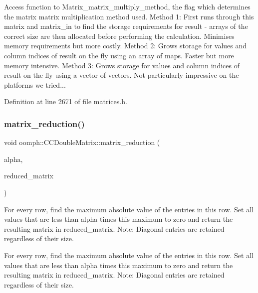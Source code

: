Access function to Matrix\+\_\+matrix\+\_\+multiply\+\_\+method, the flag which determines the matrix matrix multiplication method used. Method 1\+: First runs through this matrix and matrix\+\_\+in to find the storage requirements for result -\/ arrays of the correct size are then allocated before performing the calculation. Minimises memory requirements but more costly. Method 2\+: Grows storage for values and column indices of result \textquotesingle{}on the fly\textquotesingle{} using an array of maps. Faster but more memory intensive. Method 3\+: Grows storage for values and column indices of result \textquotesingle{}on the fly\textquotesingle{} using a vector of vectors. Not particularly impressive on the platforms we tried... 



Definition at line 2671 of file matrices.\+h.

\mbox{\label{classoomph_1_1CCDoubleMatrix_a600a58c92baf401a534598cedcfd3415}} 
\subsubsection{\texorpdfstring{matrix\+\_\+reduction()}{matrix\_reduction()}}
{\footnotesize\ttfamily void oomph\+::\+C\+C\+Double\+Matrix\+::matrix\+\_\+reduction (\begin{DoxyParamCaption}\item[{const double \&}]{alpha,  }\item[{\hyperlink{classoomph_1_1CCDoubleMatrix}{C\+C\+Double\+Matrix} \&}]{reduced\+\_\+matrix }\end{DoxyParamCaption})}



For every row, find the maximum absolute value of the entries in this row. Set all values that are less than alpha times this maximum to zero and return the resulting matrix in reduced\+\_\+matrix. Note\+: Diagonal entries are retained regardless of their size. 

For every row, find the maximum absolute value of the entries in this row. Set all values that are less than alpha times this maximum to zero and return the resulting matrix in reduced\+\_\+matrix. Note\+: Diagonal entries are retained regardless of their size. 


